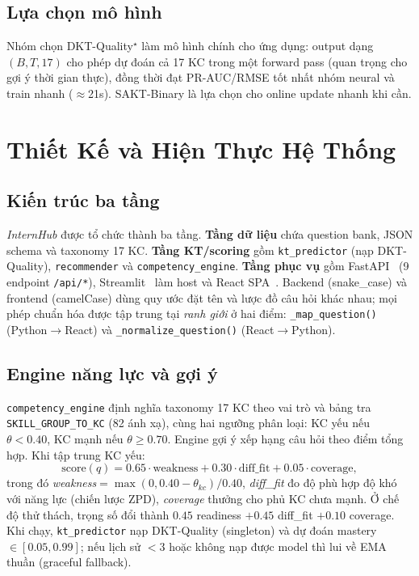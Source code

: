 \documentclass[conference]{IEEEtran}
\newcommand{\sys}{\textit{InternHub}}
\newcommand{\prauc}{PR-AUC}
\begin{document}
\subsection{Lựa chọn mô hình}
Nhóm chọn DKT-Quality$^\star$ làm mô hình chính cho ứng dụng: output dạng $(B,T,17)$ cho phép dự đoán cả 17 KC trong một forward pass (quan trọng cho gợi ý thời gian thực), đồng thời đạt \prauc{}/RMSE tốt nhất nhóm neural và train nhanh ($\approx$21s). SAKT-Binary là lựa chọn cho online update nhanh khi cần.

\section{Thiết Kế và Hiện Thực Hệ Thống}
\label{sec:system}

\subsection{Kiến trúc ba tầng}
\sys{} được tổ chức thành ba tầng. \textbf{Tầng dữ liệu} chứa question bank, JSON schema và taxonomy 17 KC. \textbf{Tầng KT/scoring} gồm \texttt{kt\_predictor} (nạp DKT-Quality), \texttt{recommender} và \texttt{competency\_engine}. \textbf{Tầng phục vụ} gồm FastAPI~\cite{fastapi2018} (9 endpoint \texttt{/api/*}), Streamlit~\cite{streamlit2019} làm host và React SPA~\cite{react2013}. Backend (snake\_case) và frontend (camelCase) dùng quy ước đặt tên và lược đồ câu hỏi khác nhau; mọi phép chuẩn hóa được tập trung tại \textit{ranh giới} ở hai điểm: \texttt{\_map\_question()} (Python$\to$React) và \texttt{\_normalize\_question()} (React$\to$Python).

\subsection{Engine năng lực và gợi ý}
\texttt{competency\_engine} định nghĩa taxonomy 17 KC theo vai trò và bảng tra \texttt{SKILL\_GROUP\_TO\_KC} (82 ánh xạ), cùng hai ngưỡng phân loại: KC yếu nếu $\theta<0.40$, KC mạnh nếu $\theta\geq 0.70$. Engine gợi ý xếp hạng câu hỏi theo điểm tổng hợp. Khi tập trung KC yếu:
\begin{equation}
\text{score}(q)=0.65\cdot\text{weakness}+0.30\cdot\text{diff\_fit}+0.05\cdot\text{coverage},
\end{equation}
trong đó \textit{weakness}$=\max(0,0.40-\theta_{kc})/0.40$, \textit{diff\_fit} đo độ phù hợp độ khó với năng lực (chiến lược ZPD), \textit{coverage} thưởng cho phủ KC chưa mạnh. Ở chế độ thử thách, trọng số đổi thành $0.45$ readiness $+0.45$ diff\_fit $+0.10$ coverage. Khi chạy, \texttt{kt\_predictor} nạp DKT-Quality (singleton) và dự đoán mastery $\in[0.05,0.99]$; nếu lịch sử $<3$ hoặc không nạp được model thì lui về EMA thuần (graceful fallback).
\end{document}
